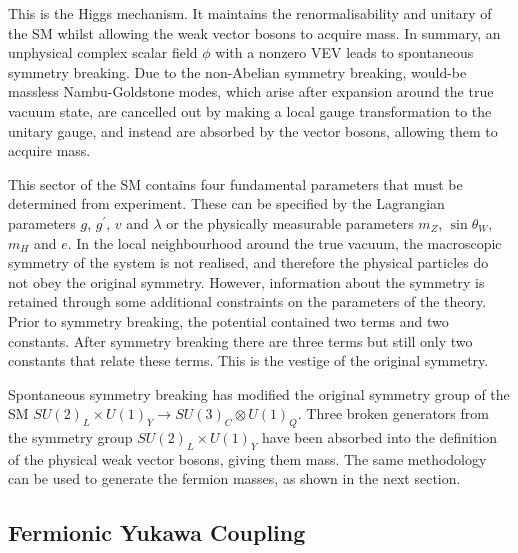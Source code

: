 This is the Higgs mechanism.
It maintains the renormalisability and unitary of the SM whilst allowing the weak vector bosons to acquire mass.
In summary, an unphysical complex scalar field $\phi$ with a nonzero VEV leads to spontaneous symmetry breaking.
Due to the non-Abelian symmetry breaking, would\nobreakdash-be massless Nambu-Goldstone modes, which arise after expansion around the true vacuum state, are cancelled out by making a local gauge transformation to the unitary gauge, and instead are absorbed by the vector bosons, allowing them to acquire mass.

This sector of the SM contains four fundamental parameters that must be determined from experiment.
These can be specified by the Lagrangian parameters $g$, $g^\prime$, $v$ and $\lambda$ or the physically measurable parameters $m_Z$, $\sin\theta_W$, $m_H$ and $e$.
In the local neighbourhood around the true vacuum, the macroscopic symmetry of the system is not realised, and therefore the physical particles do not obey the original symmetry. 
However, information about the symmetry is retained through some additional constraints on the parameters of the theory.
Prior to symmetry breaking, the potential contained two terms and two constants. After symmetry breaking there are three terms but still only two constants that relate these terms. This is the vestige of the original symmetry. %

Spontaneous symmetry breaking has modified the original symmetry group of the SM $SU(2)_L \times U(1)_Y \rightarrow SU(3)_C \otimes U(1)_Q$.
Three broken generators from the symmetry group $SU(2)_L \times U(1)_Y$ have been absorbed into the definition of the physical weak vector bosons, giving them mass.
The same methodology can be used to generate the fermion masses, as shown in the next section. 



\subsection{Fermionic Yukawa Coupling}\label{sec:higgs_yukawa_coupling}

